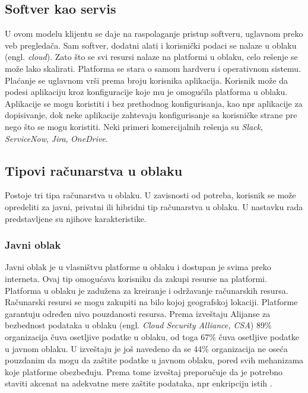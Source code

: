 \documentclass[12pt,oneside]{memoir}
\begin{document}
\subsection{Softver kao servis}
U ovom modelu klijentu se daje na raspolaganje pristup softveru, uglavnom preko veb pregledača. Sam softver, dodatni alati i korisnički podaci se nalaze u oblaku (engl. \emph{cloud}). Zato što se svi resursi nalaze na platformi u oblaku, celo rešenje se može lako skalirati. Platforma se stara o samom hardveru i operativnom sistemu. Plaćanje se uglavnom vrši prema broju korisnika aplikacija. Korisnik može da podesi aplikaciju kroz konfiguracije koje mu je omogućila platforma u oblaku. Aplikacije se mogu koristiti i bez prethodnog konfigurisanja, kao npr aplikacije za dopisivanje, dok neke aplikacije zahtevaju konfigurisanje sa korisničke strane pre nego što se mogu koristiti. Neki primeri komercijalnih rešenja su \emph{Slack}, \emph{ServiceNow}, \emph{Jira}, \emph{OneDrive}. 


\subsection{Tipovi računarstva u oblaku}

Postoje tri tipa računarstva u oblaku. U zavisnosti od potreba, korisnik se može opredeliti za javni, privatni ili hibridni tip računarstva u oblaku. U nastavku rada predstavljene su njihove karakteristike.


\subsubsection{Javni oblak} 
Javni oblak je u vlasništvu platforme u oblaku i dostupan je svima preko interneta. Ovaj tip omogućava korisniku da zakupi resurse na platformi. Platforma u oblaku je zadužena za kreiranje i održavanje računarskih resursa. Računarski resursi se mogu zakupiti na bilo kojoj geografskoj lokaciji. Platforme garantuju određen nivo pouzdanosti resursa. Prema izveštaju Alijanse za bezbednost podataka u oblaku (engl. \emph{Cloud Security Alliance, CSA}) 89\% organizacija čuva osetljive podatke u oblaku, od toga 67\% čuva osetljive podatke u javnom oblaku. U izveštaju je još navedeno da se 44\% organizacija ne oseća pouzdanim da mogu da zaštite podatke u javnom oblaku, pored svih mehanizama koje platforme obezbeđuju. Prema tome izveštaj preporučuje da je potrebno staviti akcenat na adekvatne mere zaštite podataka, npr enkripciju istih \cite{csa}.
\end{document}
